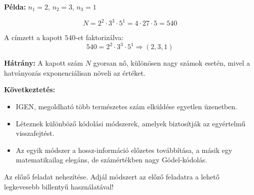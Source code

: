 \begin{solution}
\textbf{Példa:} $n_{1}=2$, $n_{2}=3$, $n_{3}=1$

\[
N=2^{2}\cdot3^{3}\cdot5^{1}=4\cdot27\cdot5=540
\]

A címzett a kapott $540$-et faktorizálva: 
\[
540=2^{2}\cdot3^{3}\cdot5^{1}\Rightarrow(2,3,1)
\]

\textbf{Hátrány:} A kapott szám $N$ gyorsan nő, különösen nagy számok
esetén, mivel a hatványozás exponenciálisan növeli az értéket.

\textbf{Következtetés:}\\
\begin{itemize}
\item IGEN, megoldható több természetes szám elküldése egyetlen üzenetben. 
\item Léteznek különböző kódolási módszerek, amelyek biztosítják az egyértelmű
visszafejtést. 
\item Az egyik módszer a hossz-információ előzetes továbbítása, a másik
egy matematikailag elegáns, de számértékben nagy Gödel-kódolás. 
\end{itemize}
\end{solution}
\begin{extraproblem}
 Az előző feladat nehezítése. Adjál módszert az előző feladatra a
lehető legkevesebb billentyű használatával! 
\end{extraproblem}

